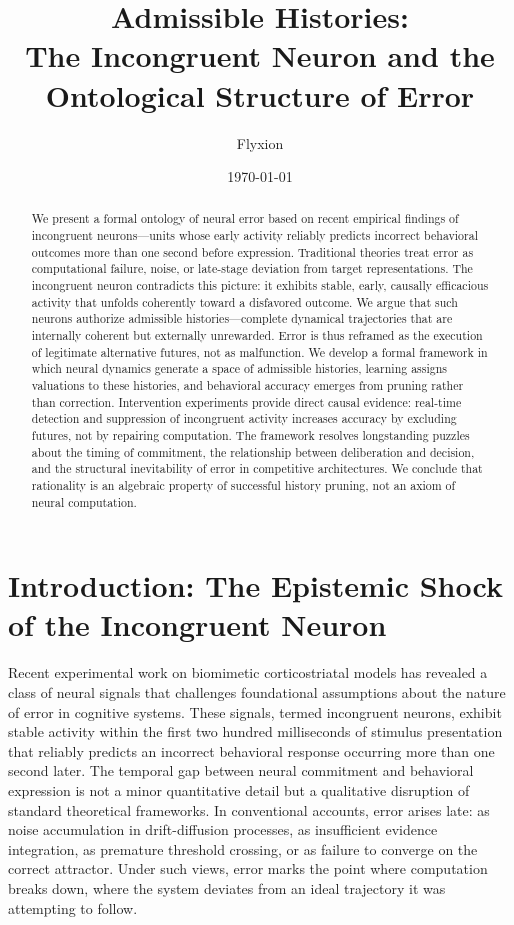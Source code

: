 \documentclass[11pt]{article}
\title{Admissible Histories:\\
The Incongruent Neuron and the Ontological Structure of Error}
\author{Flyxion}
\date{\today}
\begin{document}
\maketitle

\begin{abstract}
We present a formal ontology of neural error based on recent empirical findings of incongruent neurons—units whose early activity reliably predicts incorrect behavioral outcomes more than one second before expression. Traditional theories treat error as computational failure, noise, or late-stage deviation from target representations. The incongruent neuron contradicts this picture: it exhibits stable, early, causally efficacious activity that unfolds coherently toward a disfavored outcome. We argue that such neurons authorize admissible histories—complete dynamical trajectories that are internally coherent but externally unrewarded. Error is thus reframed as the execution of legitimate alternative futures, not as malfunction. We develop a formal framework in which neural dynamics generate a space of admissible histories, learning assigns valuations to these histories, and behavioral accuracy emerges from pruning rather than correction. Intervention experiments provide direct causal evidence: real-time detection and suppression of incongruent activity increases accuracy by excluding futures, not by repairing computation. The framework resolves longstanding puzzles about the timing of commitment, the relationship between deliberation and decision, and the structural inevitability of error in competitive architectures. We conclude that rationality is an algebraic property of successful history pruning, not an axiom of neural computation.
\end{abstract}

\section{Introduction: The Epistemic Shock of the Incongruent Neuron}

Recent experimental work on biomimetic corticostriatal models has revealed a class of neural signals that challenges foundational assumptions about the nature of error in cognitive systems. These signals, termed incongruent neurons, exhibit stable activity within the first two hundred milliseconds of stimulus presentation that reliably predicts an incorrect behavioral response occurring more than one second later. The temporal gap between neural commitment and behavioral expression is not a minor quantitative detail but a qualitative disruption of standard theoretical frameworks. In conventional accounts, error arises late: as noise accumulation in drift-diffusion processes, as insufficient evidence integration, as premature threshold crossing, or as failure to converge on the correct attractor. Under such views, error marks the point where computation breaks down, where the system deviates from an ideal trajectory it was attempting to follow.
\end{document}
